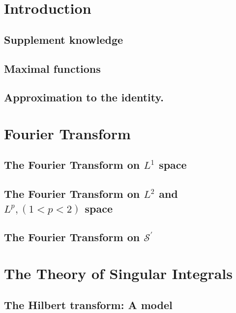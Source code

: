 \documentclass[12pt,openany]{book}
\begin{document}
\maketitle
\tableofcontents
\setcounter{page}{0}
\newpage

\chapter{Introduction}
\section{Supplement knowledge}

\section{Maximal functions}

\section{Approximation to the identity.}

\chapter{Fourier Transform}
\section{The Fourier Transform on $L^1$ space}

\section{The Fourier Transform on $L^2$ and $L^p,(1<p<2)$ space}

\section{The Fourier Transform on $\mathcal{S}^{\prime}$}

\chapter{The Theory of Singular Integrals}
\section{The Hilbert transform: A model}

\end{document}
